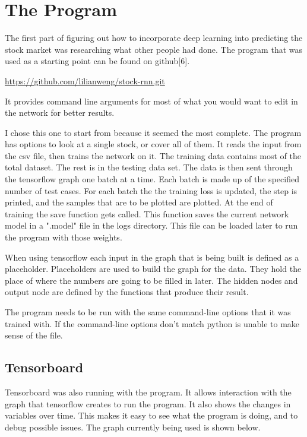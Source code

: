 \documentclass{article}
\begin{document}
\section{The Program}
The first part of figuring out how to incorporate deep learning into predicting the stock market was researching what other people had done.
The program that was used as a starting point can be found on github[6]. 
\begin{center} \url{https://github.com/lilianweng/stock-rnn.git} \end{center}
It provides command line arguments for most of what you would want to edit in the network for better results.

I chose this one to start from because it seemed the most complete.
The program has options to look at a single stock, or cover all of them.
It reads the input from the csv file, then trains the network on it. 
The training data contains most of the total dataset.
The rest is in the testing data set.
The data is then sent through the tensorflow graph one batch at a time. 
Each batch is made up of the specified number of test cases. 
For each batch the the training loss is updated, the step is printed, and the samples that are to be plotted are plotted.
At the end of training the save function gets called.
This function saves the current network model in a ".model" file in the logs directory.
This file can be loaded later to run the program with those weights.

When using tensorflow each input in the graph that is being built is defined as a placeholder.
Placeholders are used to build the graph for the data.
They hold the place of where the numbers are going to be filled in later.
The hidden nodes and output node are defined by the functions that produce their result.

The program needs to be run with the same command-line options that it was trained with.
If the command-line options don't match python is unable to make sense of the file.

\subsection{Tensorboard}
Tensorboard was also running with the program. It allows interaction with the graph that tensorflow creates to run the program. It also shows the changes in variables over time. This makes it easy to see what the program is doing, and to debug possible issues. The graph currently being used is shown below.
\end{document}
